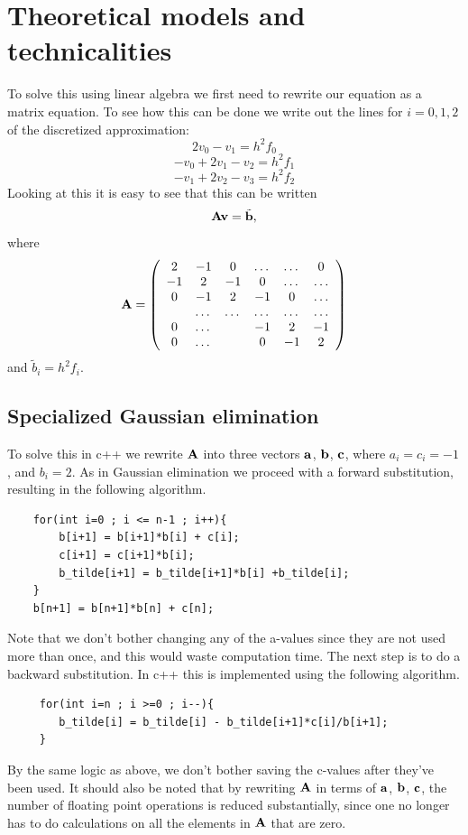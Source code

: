 \documentclass[a4paper,12pt]{article}
\begin{document}
\section{Theoretical models and technicalities}
To solve this using linear algebra we first need to rewrite our equation as a matrix equation. To see how this can be done we write out the lines for $i = 0,1,2$ of the discretized approximation:
\[
2v_{0}       - v_{1} = h^2f_0  
\]
\[
-v_{0} +2v_{1} - v_{2} = h^2f_1  
\]
\[
-v_{1} + 2v_{2} -  v_{3} = h^2f_2  
\]
Looking at this it is easy to see that this can be written
\[
   {\bf A}{\bf v} = \tilde{{\bf b}},
\]
where 
\begin{equation}
    {\bf A} = \left(\begin{array}{cccccc}
                           2& -1& 0 &\dots   & \dots &0 \\
                           -1 & 2 & -1 &0 &\dots &\dots \\
                           0&-1 &2 & -1 & 0 & \dots \\
                           & \dots   & \dots &\dots   &\dots & \dots \\
                           0&\dots   &  &-1 &2& -1 \\
                           0&\dots    &  & 0  &-1 & 2 \\
                      \end{array} \right)
\end{equation}
and $\tilde{b}_i=h^2f_i$.

\subsection{Specialized Gaussian elimination}
To solve this in c++ we rewrite $\bf A$ into three vectors $\bf a$, $\bf b$, $\bf c$,
where $a_i = c_i = -1$, and $b_i = 2$. As in Gaussian elimination we proceed with a forward substitution, resulting in the following algorithm.
\begin{verbatim}
    for(int i=0 ; i <= n-1 ; i++){
        b[i+1] = b[i+1]*b[i] + c[i];
        c[i+1] = c[i+1]*b[i];
        b_tilde[i+1] = b_tilde[i+1]*b[i] +b_tilde[i];
    }
    b[n+1] = b[n+1]*b[n] + c[n];
\end{verbatim}
Note that we don't bother changing any of the a-values since they are not used more than once, and this would waste computation time. 
The next step is to do a backward substitution. In c++ this is implemented using the following algorithm.
\begin{verbatim}
     for(int i=n ; i >=0 ; i--){
        b_tilde[i] = b_tilde[i] - b_tilde[i+1]*c[i]/b[i+1];
     }
\end{verbatim}
By the same logic as above, we don't bother saving the c-values after they've been used.
It should also be noted that by rewriting $\bf A$ in terms of $\bf a$, $\bf b$, $\bf c$, the number of floating point 
operations is reduced substantially, since one no longer has to do calculations on all the elements in $\bf A$ that are zero.
\end{document}
